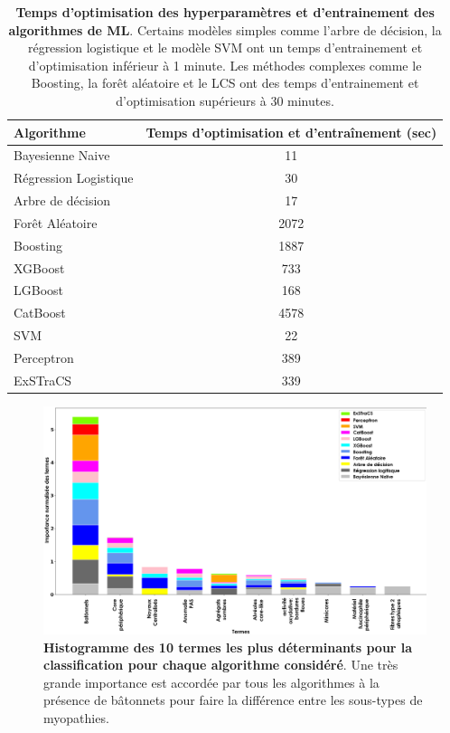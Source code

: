 \begin{table}[!ht]
    \centering
    \begin{tabular}{lc}
        \toprule
        Algorithme & Temps d'optimisation et d'entraînement (sec) \\
        \midrule
        Bayesienne Naive & 11 \\
        Régression Logistique & 30 \\
        Arbre de décision & 17 \\
        Forêt Aléatoire & 2072 \\
        Boosting & 1887 \\
        XGBoost & 733 \\
        LGBoost & 168 \\
        CatBoost & 4578 \\
        SVM & 22 \\
        Perceptron & 389 \\
        ExSTraCS & 339 \\
        \bottomrule
    \end{tabular}
    \caption[Temps d'optimisation des hyperparamètres et d'entrainement des algorithmes de ML]{\textbf{Temps d'optimisation des hyperparamètres et d'entrainement des algorithmes de ML}. Certains modèles simples comme l'arbre de décision, la régression logistique et le modèle SVM ont un temps d'entrainement et d'optimisation inférieur à 1 minute. Les méthodes complexes comme le Boosting, la forêt aléatoire et le LCS ont des temps d'entrainement et d'optimisation supérieurs à 30 minutes.}
    \label{tab:pipeline_times}
\end{table}
\begin{figure}[!ht]
  \centering
  \includegraphics[width=1\textwidth]{figures/feature_importance.png}
  \caption[Histogramme des 10 termes les plus déterminants pour la classification]{\textbf{Histogramme des 10 termes les plus déterminants pour la classification pour chaque algorithme considéré}. Une très grande importance est accordée par tous les algorithmes à la présence de bâtonnets pour faire la différence entre les sous-types de myopathies.}
  \label{fig:feautre_importance}
\end{figure}
